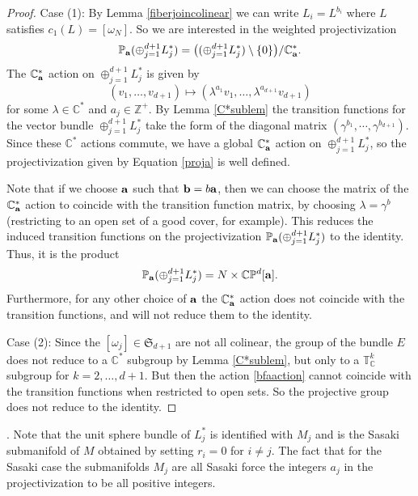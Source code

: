 \documentclass[12pt]{amsart}
\newenvironment{remark}{\medskip \refstepcounter{theorem}
\noindent  {\bf Remark \thetheorem}.\rm}{\,}
\renewcommand{\thetheorem}{\thesection.\arabic{theorem}}
\def\bbc{{\mathbb C}}
\def\bbp{{\mathbb P}}
\def\bbt{{\mathbb T}}
\def\bbz{{\mathbb Z}}
\def\grg{\gamma}
\def\grl{\lambda}
\def\gro{\omega}
\def\bfa{{\bf a}}
\def\bfb{{\bf b}}
\def\gS{{\mathfrak S}}
\begin{document}
\begin{proof}
Case (1): By Lemma \ref{fiberjoincolinear} we can write $L_i=L^{b_i}$ where $L$ satisfies $c_1(L)=[\gro_N]$. So we are interested in the weighted projectivization
\begin{equation}\label{proja}
\bbp_\bfa(\oplus_{j=1}^{d+1}L^*_j)=\bigl((\oplus_{j=1}^{d+1}L^*_j)\setminus\{0\}\bigr)/\bbc^*_\bfa.
\end{equation}
The $\bbc^*_\bfa$ action on $\oplus_{j=1}^{d+1}L^*_j$ is given by 
\begin{equation}\label{bfaaction}
(v_1,\ldots,v_{d+1})\mapsto(\grl^{a_1}v_1,\ldots,\grl^{a_{d+1}}v_{d+1})
\end{equation}
for some $\grl\in\bbc^*$ and $a_j\in\bbz^+$. By Lemma \ref{C*sublem} the transition functions for the vector bundle $\oplus_{j=1}^{d+1}L^*_j$ take the form of the diagonal matrix $(\grg^{b_1},\cdots,\grg^{b_{d+1}})$. Since these $\bbc^*$ actions commute, we have a global $\bbc^*_\bfa$ action on $\oplus_{j=1}^{d+1}L^*_j$, so the projectivization given by Equation \eqref{proja} is well defined. 


Note that if we choose $\bfa$ such that $\bfb=b\bfa$, then we can choose the matrix of the $\bbc^*_\bfa$ action to coincide with the transition function matrix, by choosing $\grl=\grg^b$ (restricting to an open set of a good cover, for example). This reduces the induced transition functions on the projectivization $\bbp_\bfa(\oplus_{j=1}^{d+1}L^*_j)$ to the identity. Thus, it is the product
$$\bbp_\bfa(\oplus_{j=1}^{d+1}L^*_j)=N\times \bbc\bbp^d[\bfa].$$
Furthermore, for any other choice of $\bfa$ the $\bbc^*_\bfa$ action does not coincide with the transition functions, and will not reduce them to the identity.

Case (2): Since the $[\gro_j]\in\gS_{d+1}$ are not all colinear, the group of the bundle $E$ does not reduce to a $\bbc^*$ subgroup by Lemma \ref{C*sublem}, but only to a $\bbt^k_\bbc$ subgroup for $k=2,\ldots,d+1$. But then the action \eqref{bfaaction} cannot coincide with the transition functions when restricted to open sets. So the projective group does not reduce to the identity.
\end{proof}

\begin{remark}\label{Mjrem}
Note that the unit sphere bundle of $L^*_j$ is identified with $M_j$ and is the Sasaki submanifold of $M$ obtained by setting $r_i=0$ for $i\neq j$. The fact that for the Sasaki case the submanifolds $M_j$ are all Sasaki force the integers $a_j$ in the projectivization to be all positive integers.
\end{remark}
\end{document}
